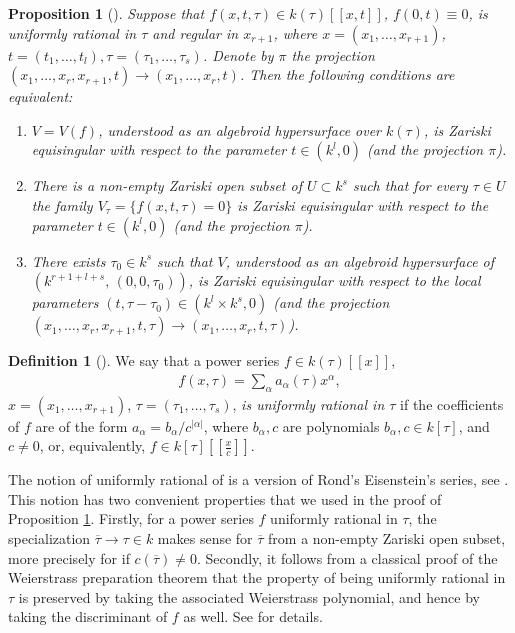 \documentclass[11pt,a4paper]{amsart}
\newcommand{\1}{{1\!\!1}}
\numberwithin{equation}{section}
\theoremstyle{plain}%
\newtheorem{prop}[thm]{Proposition}
\theoremstyle{definition}
\theoremstyle{definition}
\newtheorem{defn}[thm]{Definition}
\theoremstyle{remark}
\newcommand{\kk}{{k}}
\renewcommand{\1}{\mathbf{1}}
\begin{document}
\begin{prop}[{\cite[Proposition 3.7]{PP24}}]\label{prop:rationalinparameter}
Suppose that $f(x,t,\tau)\in \kk(\tau) [[x,t]]$, $f(0,t)\equiv 0$, is uniformly rational in $\tau$ and regular in $x_{r+1}$, where $x = (x_1, \ldots, x_{r+1})$, $t=(t_1, \ldots , t_l), \tau=(\tau_1, \ldots, \tau_s)$.  Denote by $\pi$  the projection 
$(x_1, \ldots, x_r, x_{r+1}, t)\to (x_1, \ldots, x_r, t)$. 
Then the following conditions are equivalent:
\begin{enumerate}
  \item 
$V= V(f)$, understood as an algebroid  hypersurface over $\kk(\tau)$, 
is Zariski equisingular with respect to the parameter $t \in (\kk^l,0)$ (and the projection $\pi$).  
\item
There is a non-empty Zariski open  subset of $U \subset \kk ^s$ such that 
for every $ \tau \in U$ the family 
$V_{ \tau } =\{f(x,t,\tau) =0\}$ 
is Zariski equisingular with respect to the parameter $t \in (\kk^l,0)$ (and the projection $\pi$).  
\item
There exists $ \tau_0 \in \kk ^s$ such that $V$, understood 
as an algebroid hypersurface of $(\kk^{r+1+l+s},\,  (0,0,\tau_0))$, 
is Zariski equisingular with respect to the local parameters 
$(t,\tau-  \tau_0) \in (\kk^l \times \kk^s,0)$ (and the projection $(x_1, \ldots ,x_r, x_{r+1}, t,\tau)\to (x_1, \ldots ,x_r, t, \tau)$).  
\end{enumerate}
\end{prop}

\begin{defn}[{\cite[Definition 3.5]{PP24}}]
We say that a power series $f\in \kk(\tau) [[x]]$, 
\begin{align}
f(x,\tau) = \sum_\alpha a_\alpha(\tau ) x^\alpha,  
\end{align}
$x=(x_1, \ldots, x_{r+1}) $, 
$\tau=(\tau_1, \ldots, \tau_s)$, \emph {is uniformly rational in $\tau$}
if the  coefficients of $f$ are of the 
form $a_\alpha = b_\alpha/c^{|\alpha|}$, 
where $b_\alpha, c $ are polynomials $b_\alpha, c \in \kk[\tau]$, 
and $c\ne 0$, or, equivalently, $f\in \kk[\tau] [[\frac x c]]$. 
\end{defn}

The notion of uniformly rational of \cite[Section 3.3]{PP24}   
is a version of Rond's Eisenstein's series, see  \cite{rond18, rondeisensteins, ranktheorems}.  
This notion has two convenient properties that we used in the proof of Proposition \ref{prop:rationalinparameter}.  
Firstly, for a power series $f$ uniformly rational in $\tau$,  the 
 specialization $\overline \tau \to \tau\in \kk$ makes sense for $\overline \tau$ from a non-empty Zariski open subset, more precisely for 
 if $c(\overline \tau) \ne 0$.  
Secondly,  it follows from a classical proof of the Weierstrass preparation theorem that the property of being
 uniformly rational in $\tau$ is preserved by taking the associated Weierstrass polynomial, and hence by taking the discriminant of $f$ as well. See \cite[Section 3.3]{PP24} for details.  
  
\end{document}
